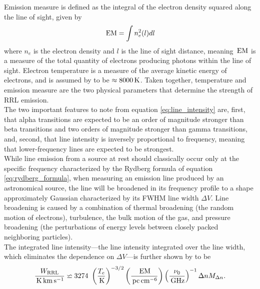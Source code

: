 Emission measure is defined as the integral of the electron density squared along the line of sight, given by
\begin{equation}
    \, \mathrm{EM} = \int n_e^2(l) dl
\end{equation}
where \(n_e\) is the electron density and \(l\) is the line of sight distance, meaning \(\, \mathrm{EM}\) is a measure of the total quantity of electrons producing photons within the line of sight. Electron temperature is a measure of the average kinetic energy of electrons, and is assumed by \citet{andersonGBTDiffuseIonized2021} to be \(\approx 8000 \, \mathrm{K}\). Taken together, temperature and emission measure are the two physical parameters that determine the strength of RRL emission.\\

The two important features to note from equation \eqref{eq:line_intensity} are, first, that alpha transitions are expected to be an order of magnitude stronger than beta transitions and two orders of magnitude stronger than gamma transitions, and, second, that line intensity is inversely proportional to frequency, meaning that lower-frequency lines are expected to be strongest.\\

While line emission from a source at rest should classically occur only at the specific frequency characterized by the Rydberg formula of equation \eqref{eq:rydberg_formula}, when measuring an emission line produced by an astronomical source, the line will be broadened in its frequency profile to a shape approximately Gaussian characterized by its FWHM line width \(\Delta V\). Line broadening is caused by a combination of thermal broadening (the random motion of electrons), turbulence, the bulk motion of the gas, and pressure broadening (the perturbations of energy levels between closely packed neighboring particles).\\

The integrated line intensity---the line intensity integrated over the line width, which eliminates the dependence on \(\Delta V\)---is further shown by \citet{andersonGBTDiffuseIonized2021} to be
\begin{equation}
    \frac{W_\mathrm{RRL}}{\, \mathrm{K} \, \mathrm{km} \, \mathrm{s}^{-1}} \backsimeq 3274~\left(\frac{T_e}{\, \mathrm{K}}\right)^{-3/2}\left(\frac{\, \mathrm{EM}}{\, \mathrm{pc} \, \mathrm{cm}^{-6}}\right) \left(\frac{\nu_0}{\, \mathrm{GHz}}\right)^{-1} \Delta n M_{\Delta n}.
\end{equation}
